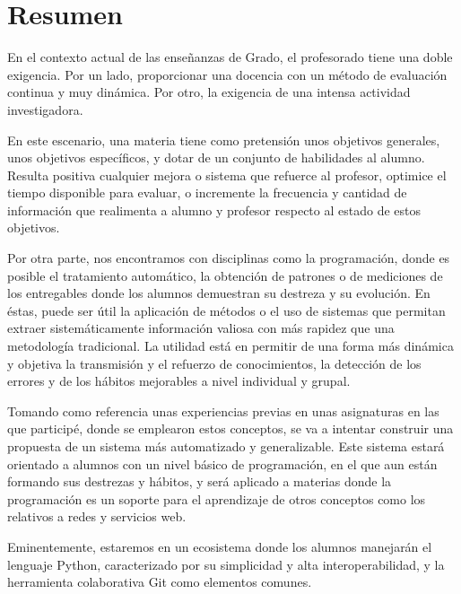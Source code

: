 
\chapter*{Resumen}

En el contexto actual de las enseñanzas de Grado, el profesorado tiene una doble exigencia. Por un lado, proporcionar una docencia con un método de evaluación continua y muy dinámica. Por otro, la exigencia de una intensa actividad investigadora. 

En este escenario, una materia tiene como pretensión unos objetivos generales, unos objetivos específicos, y dotar de un conjunto de habilidades al alumno. Resulta positiva cualquier mejora o sistema que refuerce al profesor, optimice el tiempo disponible para evaluar, o incremente la frecuencia y cantidad de información que realimenta a alumno y profesor respecto al estado de estos objetivos.

Por otra parte, nos encontramos con disciplinas como la programación, donde es posible el tratamiento automático, la obtención de patrones o de mediciones de los entregables donde los alumnos demuestran su destreza y su evolución. En éstas, puede ser útil la aplicación de métodos o el uso de sistemas que permitan extraer sistemáticamente información valiosa con más rapidez que una metodología tradicional. La utilidad está en permitir de una forma más dinámica y objetiva la transmisión y el refuerzo de conocimientos, la detección de los errores y de los hábitos mejorables a nivel individual y grupal.

Tomando como referencia unas experiencias previas en unas asignaturas en las que participé, donde se emplearon estos conceptos, se va a intentar construir una propuesta de un sistema más automatizado y generalizable. Este sistema estará orientado a alumnos con un nivel básico de programación, en el que aun están formando sus destrezas y hábitos, y será aplicado a materias donde la programación es un soporte para el aprendizaje de otros conceptos como los relativos a redes y servicios web.

Eminentemente, estaremos en un ecosistema donde los alumnos manejarán el lenguaje Python, caracterizado por su simplicidad y alta interoperabilidad, y la herramienta colaborativa Git como elementos comunes.



